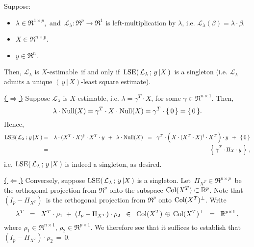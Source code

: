 \begin{proposition}
\label{VectorEstimabilityImpliesUniqueLSE}
\mbox{}\vskip 0.1cm\noindent
Suppose:
\begin{itemize}
\item
	$\lambda \in \Re^{1 \times p}$,\,
	and
	\,$\mathcal{L}_{\lambda} : \Re^{p} \longrightarrow \Re^{1}$ is left-multiplication by $\lambda$,
	i.e. $\mathcal{L}_{\lambda}(\beta) = \lambda \cdot \beta$.
\item
	$X \in \Re^{n \times p}$.
\item
	$y \in \Re^{n}$.
\end{itemize}
Then,
	$\mathcal{L}_{\lambda}$ is $X$-estimable
	\,if and only if\,
	$\textnormal{LSE}\!\left(\,\mathcal{L}_{\lambda} \,;\, y\,\vert X\,\right)$\,
	is a singleton (i.e. $\mathcal{L}_{\lambda}$ admits a unique $(\,y\,\vert\,X)$-least square estimate).
\end{proposition}
\proof
\vskip 0.2cm\noindent
\underline{\textbf{(\,$\Longrightarrow$\,)}}\quad
Suppose $\mathcal{L}_{\lambda}$ is $X$-estimable, i.e. $\lambda = \gamma^{T} \cdot X$,
for some $\gamma \in \Re^{n \times 1}$.
Then,
\begin{equation*}
\lambda\cdot\textnormal{Null}(X) = \gamma^{T} \cdot X \cdot \textnormal{Null}(X) = \gamma^{T} \cdot \{\,0\,\} = \{\,0\,\}.
\end{equation*}
Hence,
\begin{eqnarray*}
\lse\!\left(\,\mathcal{L}_{\lambda} \,;\, y\,\vert X\,\right)
&=&
	\lambda \cdot (X^{T} \cdot X)^{\dagger} \cdot X^{T} \cdot y \;\, + \;\, \lambda \cdot \Null(X)
\;\;=\;\;
	\gamma^{T} \cdot \left(\,\overset{{\color{white}.}}{X} \cdot (X^{T} \cdot X)^{\dagger} \cdot X^{T}\,\right) \cdot y \;\, + \;\, \{\,0\,\}
\\
&=&
	\left\{\; \overset{{\color{white}.}}{\gamma}^{T} \cdot \Pi_{X} \cdot y \;\right\}\,,
\end{eqnarray*}
i.e. $\textnormal{LSE}\!\left(\,\mathcal{L}_{\lambda} \,;\, y\,\vert X\,\right)$ is indeed a singleton, as desired.

\vskip 0.5cm\noindent
\underline{\textbf{(\,$\Longleftarrow$\,)}}\quad
Conversely, suppose $\textnormal{LSE}\!\left(\,\mathcal{L}_{\lambda} \,;\, y\,\vert X\,\right)$ is a singleton.
Let \,$\Pi_{X^{T}} \in \Re^{p \times p}$\, be the orthogonal projection from $\Re^{p}$ onto
the subspace $\textnormal{Col}(X^{T}) \subset \mathbb{R}^{p}$.
Note that \,$(I_{p} - \Pi_{X^{T}})$\, is the orthogonal projection from $\Re^{p}$ onto $\textnormal{Col}(X^{T})^{\perp}$.
Write
\begin{equation*}
\lambda^{T}
\;\;=\;\;
	X^{T} \cdot \rho_{1} \;+\; (I_{p} - \Pi_{X^{T}}) \cdot \rho_{2}
\;\;\in\;\;
	\textnormal{Col}(X^{T}) \,\oplus\, \textnormal{Col}(X^{T})^{\perp}
\;\;=\;\;
	\mathbb{R}^{p \times 1}\,,
\end{equation*}
where $\rho_{1} \in \Re^{n \times 1}$, $\rho_{2} \in \Re^{p \times 1}$.
We therefore see that it suffices to establish that $(I_{p} - \Pi_{X^{T}}) \cdot \rho_{2} \,=\, 0$.

